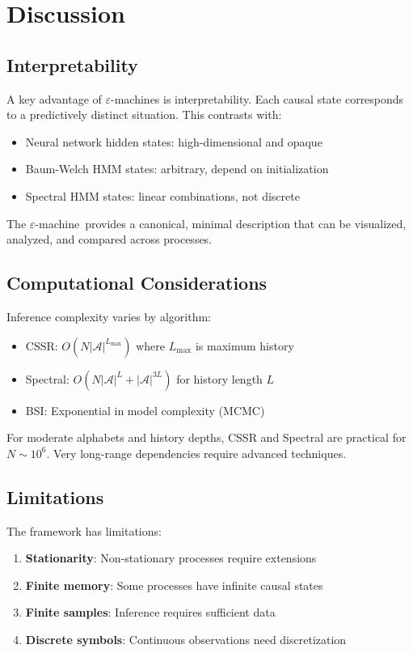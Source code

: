\documentclass[11pt,twocolumn]{article}
\theoremstyle{plain}
\theoremstyle{definition}
\theoremstyle{remark}
\newcommand{\eps}{\varepsilon}
\newcommand{\eM}{$\eps$-machine}
\newcommand{\calA}{\mathcal{A}}
\begin{document}
\section{Discussion}
\label{sec:discussion}

\subsection{Interpretability}

A key advantage of \eM s is interpretability. Each causal state corresponds to a predictively distinct situation. This contrasts with:
\begin{itemize}[nosep]
    \item Neural network hidden states: high-dimensional and opaque
    \item Baum-Welch HMM states: arbitrary, depend on initialization
    \item Spectral HMM states: linear combinations, not discrete
\end{itemize}

The \eM\ provides a canonical, minimal description that can be visualized, analyzed, and compared across processes.

\subsection{Computational Considerations}

Inference complexity varies by algorithm:
\begin{itemize}[nosep]
    \item CSSR: $O(N |\calA|^{L_{\max}})$ where $L_{\max}$ is maximum history
    \item Spectral: $O(N |\calA|^{L} + |\calA|^{3L})$ for history length $L$
    \item BSI: Exponential in model complexity (MCMC)
\end{itemize}

For moderate alphabets and history depths, CSSR and Spectral are practical for $N \sim 10^6$. Very long-range dependencies require advanced techniques.

\subsection{Limitations}

The framework has limitations:
\begin{enumerate}[nosep]
    \item \textbf{Stationarity}: Non-stationary processes require extensions
    \item \textbf{Finite memory}: Some processes have infinite causal states
    \item \textbf{Finite samples}: Inference requires sufficient data
    \item \textbf{Discrete symbols}: Continuous observations need discretization
\end{enumerate}
\end{document}
